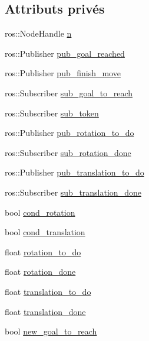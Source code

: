 \subsection*{Attributs privés}
\begin{DoxyCompactItemize}
\item 
ros\+::\+Node\+Handle \hyperlink{classdecision_a3757d1a1da5a045caff6b58c8b71f559}{n}
\item 
ros\+::\+Publisher \hyperlink{classdecision_ae19f3ccf052d2d7fa227038ee1f5b188}{pub\+\_\+goal\+\_\+reached}
\item 
ros\+::\+Publisher \hyperlink{classdecision_af35e8bab2af3a5737120d14148aea79b}{pub\+\_\+finish\+\_\+move}
\item 
ros\+::\+Subscriber \hyperlink{classdecision_a088684a934191a0ad40f3e61ad3691ed}{sub\+\_\+goal\+\_\+to\+\_\+reach}
\item 
ros\+::\+Subscriber \hyperlink{classdecision_a02e3400afdb00b874d96f1f49b9bb929}{sub\+\_\+token}
\item 
ros\+::\+Publisher \hyperlink{classdecision_ad558fa4353559c47a042cd6619c8d2a7}{pub\+\_\+rotation\+\_\+to\+\_\+do}
\item 
ros\+::\+Subscriber \hyperlink{classdecision_a429cdcb43bc24e661fd361c77f66c82c}{sub\+\_\+rotation\+\_\+done}
\item 
ros\+::\+Publisher \hyperlink{classdecision_af74b71a091485c829679882417c113d5}{pub\+\_\+translation\+\_\+to\+\_\+do}
\item 
ros\+::\+Subscriber \hyperlink{classdecision_abec51fe792a7230e4afe73dca2eb83dd}{sub\+\_\+translation\+\_\+done}
\item 
bool \hyperlink{classdecision_ac1ed0807df9d2681e605d9091572efe5}{cond\+\_\+rotation}
\item 
bool \hyperlink{classdecision_a87f539f24dbb7d16c3785e41ef0db3d5}{cond\+\_\+translation}
\item 
float \hyperlink{classdecision_ab8f9703ded89c8fa9d3be694934188c7}{rotation\+\_\+to\+\_\+do}
\item 
float \hyperlink{classdecision_afbccffed34269bd18f004232facbced2}{rotation\+\_\+done}
\item 
float \hyperlink{classdecision_ad49356a943ddd0a5e11cef4fe00ab201}{translation\+\_\+to\+\_\+do}
\item 
float \hyperlink{classdecision_a7917b74f63ec0ad3d43ceb7d06a56f0c}{translation\+\_\+done}
\item 
bool \hyperlink{classdecision_a5e8a80eb8c5d11f884079c643754b0d8}{new\+\_\+goal\+\_\+to\+\_\+reach}

\end{DoxyCompactItemize}
